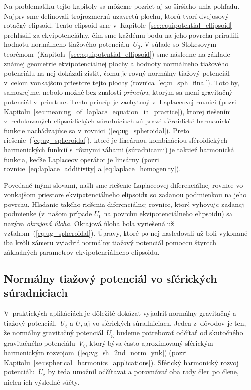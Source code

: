 \documentclass[a4paper,12pt]{book}
\newcommand{\gidx}{\mathrm g}
\begin{document}
Na problematiku tejto kapitoly sa môžeme pozrieť aj zo širšieho uhla pohľadu.  
Najprv sme definovali trojrozmernú uzavretú plochu, ktorú tvorí dvojosový 
rotačný elipsoid.  Tento elipsoid sme 
v~Kapitole~\ref{sec:equipotential_ellipsoid} prehlásili za ekvipotenciálny, čím 
sme každému bodu na jeho povrchu priradili hodnotu normálneho tiažového 
potenciálu~$U_0$.  V súlade so Stokesovým 
teorémom~(Kapitola~\ref{sec:equipotential_ellipsoid}) sme následne na základe 
známej geometrie ekvipotenciálnej plochy a hodnoty normálneho tiažového 
potenciálu na nej dokázali zistiť, čomu je rovný normálny tiažový potenciál 
v~celom vonkajšom priestore tejto plochy (rovnica~\ref{eq:u_sph_final}).  Toto 
by, samozrejme, nebolo možné bez znalosti \emph{princípu}, ktorým sa mení 
gravitačný potenciál v~priestore.  Tento princíp je zachytený v~Laplaceovej 
rovnici (pozri Kapitolu~\ref{sec:meaning_of_laplace_equation_in_practice}), 
ktorej riešením v~redukovaných elipsoidických súradniciach sú pravé sféroidické 
harmonické funkcie nachádzajúce sa v~rovnici~(\ref{eq:ug_spheroidal}).  Preto 
riešenie~(\ref{eq:ug_spheroidal}), ktoré je lineárnou kombináciou sféroidických 
harmonických funkcií s~rôznymi váhami (súradnicami) je taktiež harmonická 
funkcia, keďže Laplaceov operátor je lineárny (pozri 
rovnice~\ref{eq:laplace_additivity} a \ref{eq:laplace_homogenity}).

Povedané inými slovami, našli sme riešenie Laplaceovej diferenciálnej rovnice 
vo vonkajšom priestore ekvipotenciálneho elipsoidu so zadanou podmienkou na 
jeho povrchu.  Hľadanie takého riešenia diferenciálnej rovnice, ktoré vyhovuje 
zadanej podmienke (v~našom prípade $U_0$ na povrchu ekvipotenciálneho 
elipsoidu) sa nazýva \emph{okrajová úloha}.  Okrajová úloha bola vyriešená už 
vzťahom~(\ref{eq:ug_spheroidal}).  Úpravy, ktoré po nej nasledovali už boli 
vykonané iba kvôli zámeru vyjadriť normálny tiažový potenciál pomocou štyroch 
základných parametrov ekvipotenciálneho elipsoidu.





\subsection{Normálny tiažový potenciál vo sférických súradniciach}
\label{sec:normal_gravity_potential_in_spherical_coords}

V~praktických aplikáciách je dôležité dokázať vyjadriť normálny gravitačný 
a tiažový potenciál,~$U_\gidx$ a $U$, aj vo sférických súradniciach.  Jeden 
z~dôvodov je ten, že normálny gravitačný potenciál~$U_\gidx$ budeme potrebovať 
odčítať od skutočného gravitačného potenciálu~$V_\gidx$, ktorý býva často 
aproximovaný sférickým harmonickým rozvojom~(\ref{eq:vg_sh_2nd_norm_ynk}) 
(pozri Kapitolu~\ref{sec:spherical_harmonics_applications}).  Sférický 
harmonický rozvoj potenciálu~$U_\gidx$ by teda umožnil odčítavať a porovnávať 
oba rady člen po člene, nielen ich výsledné súčty.
\end{document}
